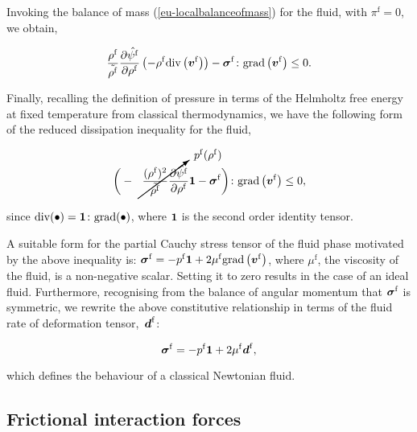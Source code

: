 \noindent Invoking the balance of mass (\ref{eu-localbalanceofmass})
for the fluid, with $\pi^\mathrm{f} = 0$, we obtain,

\begin{equation*}
\frac{\rho^{\mathrm{f}}}{\tilde{\rho^{\mathrm{f}}}}
\frac{\partial \hat{\psi^{\mathrm{f}}}}{\partial \rho^{\mathrm{f}}}
\left(- \rho^{\mathrm{f}} \mathrm{div}\left(\mbox{\boldmath$ v$}^{\mathrm{f}}
\right)\right) 
-\mbox{\boldmath$\sigma$}^{\mathrm{f}}\colon\mathrm{grad}
\left(\mbox{\boldmath$ v$}^{\mathrm{f}}\right)
\leq 0.
\end{equation*}

\noindent Finally, recalling the definition of pressure in terms of
the Helmholtz free energy at fixed temperature from classical
thermodynamics, we have the following form of the reduced dissipation
inequality for the fluid,

\begin{equation*}
\bigg( - \cancelto{p^{\mathrm{f}}(\rho^{\mathrm{f}})}
{\frac{(\rho^{\mathrm{f}})^2}{\tilde{\rho^{\mathrm{f}}}}
\frac{\partial \hat{\psi^{\mathrm{f}}}}{\partial \rho^{\mathrm{f}}}}
\bone -\Bsigma^{\mathrm{f}} \bigg) \colon \mathrm{grad}\left(\bv^{\mathrm{f}}
\right)
\leq 0,
\end{equation*}

\noindent since \mbox{$\mathrm{div}(\bullet) = {\bf 1} \colon
  \mathrm{grad}(\bullet)$}, where ${\bf 1}$ is the second order
identity tensor.

A suitable form for the partial Cauchy stress tensor of the fluid
phase motivated by the above inequality is: $\mbox{\boldmath$\sigma$}^{\mathrm{f}} = -
p^{\mathrm{f}} {\bf 1} + 2 \mu^{\mathrm{f}} \mathrm{grad}\left(
\mbox{\boldmath$ v$}^{\mathrm{f}} \right)$, where $\mu^{\mathrm{f}}$, the viscosity of
the fluid, is a non-negative scalar. Setting it to zero results in the
case of an ideal fluid. Furthermore, recognising from the balance of
angular momentum that $\mbox{\boldmath$\sigma$}^{\mathrm{f}}$ is symmetric, we rewrite
the above constitutive relationship in terms of the fluid rate of
deformation tensor,~$\mbox{\boldmath$ d$}^{\mathrm{f}}$:

\begin{equation}
\mbox{\boldmath$\sigma$}^{\mathrm{f}} = -
p^{\mathrm{f}} {\bf 1} + 2 \mu^{\mathrm{f}}\mbox{\boldmath$ d$}^{\mathrm{f}},
\label{eu-stress-rel-fluid}
\end{equation}

\noindent which defines the behaviour of a classical Newtonian fluid.

\subsection{Frictional interaction forces}
\label{eu-interaction-forces}

